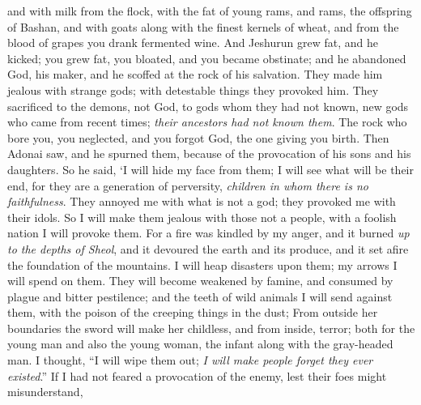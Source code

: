 \begin{biblechapter}
and with milk from the flock, 
with the fat of young rams, 
and rams, the offspring of Bashan, 
and with goats along with the finest kernels of wheat, 
and from the blood of grapes you drank fermented wine.
\verse And Jeshurun grew fat, and he kicked; 
you grew fat, you bloated, and you became obstinate; 
and he abandoned God, his maker, 
and he scoffed at the rock of his salvation.
\verse They made him jealous with strange gods; 
with detestable things they provoked him.
\verse They sacrificed to the demons, not God, 
to gods whom they had not known, 
new gods who came from recent times; 
\textit{their ancestors had not known them}.
\verse The rock who bore you, you neglected, 
and you forgot God, the one giving you birth.
\verse Then Adonai saw, and he spurned them, 
because of the provocation of his sons and his daughters.
\verse So he said, ‘I will hide my face from them; 
I will see what will be their end, 
for they are a generation of perversity, 
\textit{children in whom there is no faithfulness}.
\verse They annoyed me with what is not a god; 
they provoked me with their idols. 
So I will make them jealous with those not a people, 
with a foolish nation I will provoke them.
\verse For a fire was kindled by my anger, 
and it burned \textit{up to the depths of Sheol}, 
and it devoured the earth and its produce, 
and it set afire the foundation of the mountains.
\verse I will heap disasters upon them; 
my arrows I will spend on them.
\verse They will become weakened by famine, 
and consumed by plague and bitter pestilence; 
and the teeth of wild animals I will send against them, 
with the poison of the creeping things in the dust;
\verse From outside her boundaries the sword will make her childless, 
and from inside, terror; 
both for the young man and also the young woman, 
the infant along with the gray-headed man.
\verse I thought, “I will wipe them out; 
\textit{I will make people forget they ever existed}.”
\verse If I had not feared a provocation of the enemy, 
lest their foes might misunderstand,  

\end{biblechapter}
